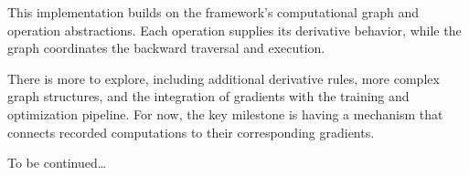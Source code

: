 This implementation builds on the framework's computational graph and operation abstractions. Each operation supplies its derivative behavior, while the graph coordinates the backward traversal and execution.

There is more to explore, including additional derivative rules, more complex graph structures, and the integration of gradients with the training and optimization pipeline. For now, the key milestone is having a mechanism that connects recorded computations to their corresponding gradients.

To be continued\ldots